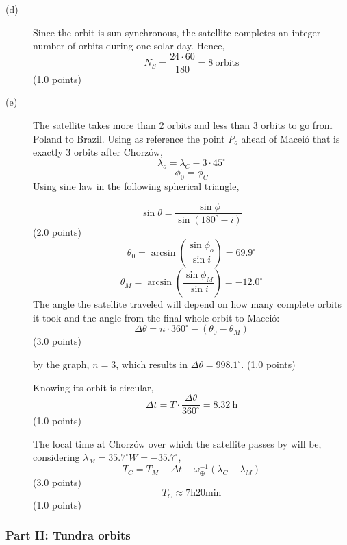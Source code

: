 \begin{description}
\item[(d)] Since the orbit is sun-synchronous, the satellite completes an
  integer number of orbits during one solar day. Hence,
  \[
    N_S = \frac{24\cdot60}{180} = 8\ \text{orbits}
  \]
  \hfill(1.0 points)

\item[(e)] The satellite takes more than 2 orbits and less than 3 orbits to go
  from Poland to Brazil. Using as reference the point $P_o$ ahead of Macei\'o
  that is exactly 3 orbits after Chorz\'ow,
  \[
    \lambda_o = \lambda_C - 3\cdot45^\circ
  \]
  \[
    \phi_0 = \phi_C
  \]
  Using sine law in the following spherical triangle,


  \[
    \sin\theta = \frac{\sin\phi}{\sin(180^\circ - i)}
  \]
  \hfill(2.0 points)
  \[
    \theta_0 = \arcsin\left(\frac{\sin\phi_o}{\sin i}\right) = 69.9^\circ
  \]
  \[
    \theta_M = \arcsin\left(\frac{\sin\phi_M}{\sin i}\right) = -12.0^\circ
  \]
  The angle the satellite traveled will depend on how many complete orbits it
  took and the angle from the final whole orbit to Macei\'o:
  \[
    \Delta\theta = n\cdot360^\circ - (\theta_0 - \theta_M)
  \]
  \hfill(3.0 points)

  by the graph, $n = 3$, which results in $\Delta\theta = 998.1^\circ$.
  \hfill(1.0 points)

  Knowing its orbit is circular,
  \[
    \Delta t = T\cdot\frac{\Delta\theta}{360^\circ} = 8.32\ \mathrm{h}
  \]
  \hfill(1.0 points)

  The local time at Chorz\'ow over which the satellite passes by will be,
  considering $\lambda_M = 35.7^\circ W = -35.7^\circ$,
  \[
    T_C = T_M - \Delta t + \omega_\oplus^{-1}(\lambda_C - \lambda_M)
  \]
  \hfill(3.0 points)
  \[
    \boxed{T_C \approx 7\mathrm{h}20\mathrm{min}}
  \]
  \hfill(1.0 points)
\end{description}

\subsubsection*{Part II: Tundra orbits}

